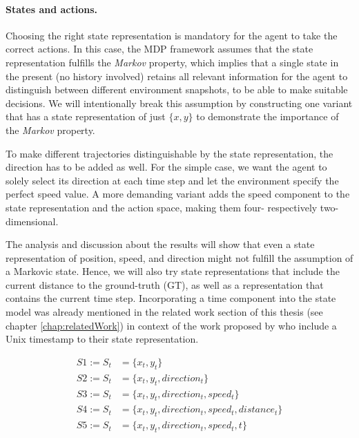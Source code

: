 \paragraph{States and actions.} Choosing the right state representation is mandatory for the agent to take the correct actions. In this case, the MDP framework assumes that the state representation fulfills the \textit{Markov} property, which implies that a single state in the present (no history involved) retains all relevant information for the agent to distinguish between different environment snapshots, to be able to make suitable decisions. We will intentionally break this assumption by constructing one variant that has a state representation of just $\{x,y\}$ to demonstrate the importance of the \textit{Markov} property.
\par
To make different trajectories distinguishable by the state representation, the direction has to be added as well. For the simple case, we want the agent to solely select its direction at each time step and let the environment specify the perfect speed value. A more demanding variant adds the speed component to the state representation and the action space, making them four- respectively two-dimensional.
\par
The analysis and discussion about the results will show that even a state representation of position, speed, and direction might not fulfill the assumption of a Markovic state. Hence, we will also try state representations that include the current distance to the ground-truth (GT), as well as a representation that contains the current time step. Incorporating a time component into the state model was already mentioned in the related work section of this thesis (see chapter \ref{chap:relatedWork}) in context of the work proposed by \cite{liu2019vessel} who include a Unix timestamp to their state representation.

\begin{equation}
\begin{aligned}
    S1 := S_t &= \{x_t,y_t\}
\\
    S2 := S_t &= \{x_t,y_t, direction_t\}
\\
    S3 := S_t &= \{x_t,y_t, direction_t, speed_t\}
\\
    S4 := S_t &= \{x_t,y_t, direction_t, speed_t, distance_t\}
\\
    S5 := S_t &= \{x_t,y_t, direction_t, speed_t, t\}
    \end{aligned}
\end{equation}\label{stateRepresentation}

